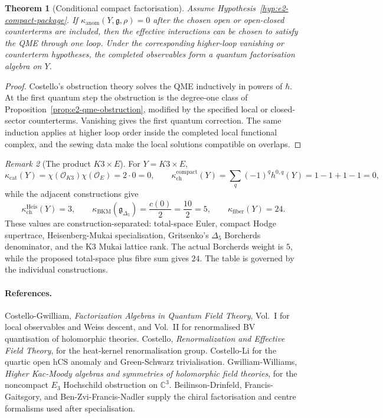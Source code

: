 \documentclass[11pt]{amsart}
\providecommand{\C}{\mathbb{C}}
\providecommand{\hb}{\hbar}
\providecommand{\g}{\mathfrak{g}}
\providecommand{\cO}{\mathcal{O}}
\providecommand{\kch}{\kappa_{\mathrm{ch}}}
\providecommand{\kcat}{\kappa_{\mathrm{cat}}}
\providecommand{\kBKM}{\kappa_{\mathrm{BKM}}}
\providecommand{\kfib}{\kappa_{\mathrm{fiber}}}
\providecommand{\kanom}{\kappa_{\mathrm{anom}}}
\theoremstyle{plain}
\newtheorem{theorem}{Theorem}[section]
\theoremstyle{definition}
\theoremstyle{remark}
\newtheorem{remark}[theorem]{Remark}
\begin{document}
\begin{theorem}[Conditional compact factorisation]\label{thm:e2-compact-conditional}
Assume Hypothesis~\ref{hyp:e2-compact-package}. If
\(\kanom(Y,\g,\rho)=0\) after the chosen open or open-closed
counterterms are included, then the effective interactions can be
chosen to satisfy the QME through one loop. Under the corresponding
higher-loop vanishing or counterterm hypotheses, the completed
observables form a quantum factorisation algebra on \(Y\).
\end{theorem}

\begin{proof}
Costello's obstruction theory solves the QME inductively in powers of
\(\hb\). At the first quantum step the obstruction is the degree-one
class of Proposition~\ref{prop:e2-qme-obstruction}, modified by the
specified local or closed-sector counterterms. Vanishing gives the
first quantum correction. The same induction applies at higher loop
order inside the completed local functional complex, and the sewing
data make the local solutions compatible on overlaps.
\end{proof}

\begin{remark}[The product $K3\times E$]\label{rem:e2-k3e-values}
For $Y=K3\times E$,
\[
 \kcat(Y)=\chi(\cO_{K3})\chi(\cO_E)=2\cdot0=0,
 \qquad
 \kch^{\mathrm{compact}}(Y)=
 \sum_q(-1)^qh^{0,q}(Y)=1-1+1-1=0,
\]
while the adjacent constructions give
\[
 \kch^{\mathrm{Heis}}(Y)=3,\qquad
 \kBKM(\mathfrak g_{\Delta_5})=\frac{c(0)}2=\frac{10}{2}=5,
 \qquad
 \kfib(Y)=24.
\]
These values are construction-separated: total-space Euler, compact
Hodge supertrace, Heisenberg-Mukai specialisation, Gritsenko's
\(\Delta_5\) Borcherds denominator, and the K3 Mukai lattice rank.
The actual Borcherds weight is \(5\), while the proposed total-space
plus fibre sum gives \(24\).  The table is governed by the individual
constructions.
\end{remark}

\paragraph{References.}
Costello-Gwilliam, \emph{Factorization Algebras in Quantum Field
Theory}, Vol.~I for local observables and Weiss descent, and Vol.~II
for renormalised BV quantisation of holomorphic theories. Costello,
\emph{Renormalization and Effective Field Theory}, for the heat-kernel
renormalisation group. Costello-Li for the quartic open hCS anomaly and
Green-Schwarz trivialisation. Gwilliam-Williams, \emph{Higher Kac-Moody
algebras and symmetries of holomorphic field theories}, for the
noncompact \(E_3\) Hochschild obstruction on \(\C^3\).
Beilinson-Drinfeld, Francis-Gaitsgory, and Ben-Zvi-Francis-Nadler supply
the chiral factorisation and centre formalisms used after
specialisation.
\end{document}
